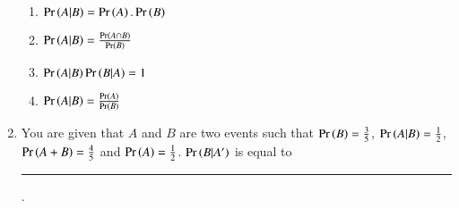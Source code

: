\begin{enumerate}[label=\thesubsection.\arabic*,ref=\thesubsection.\theenumi]
\begin{multicols}{2}
\begin{enumerate}
	\item $\Pr\left(A|B\right) = \Pr\left(A\right).\Pr\left(B\right)$
	\item $\Pr\left(A|B\right) = \frac{\Pr\left(A\cap B\right)}{\Pr\left(B\right)}$
	\item $\Pr\left(A|B\right)\Pr\left(B|A\right) = 1$
	\item $\Pr\left(A|B\right) = \frac{\Pr\left(A\right)}{\Pr\left(B\right)}$
\end{enumerate}
\end{multicols}
\item You are given that $A$ and $B$ are two events such that $\Pr\left(B\right)=\frac{3}{5}$, $\Pr\left(A  |  B\right)=\frac{1}{2}$, $\Pr\left(A+B\right)=\frac{4}{5}$ and $\Pr\left(A\right)=\frac{1}{2}$.  $\Pr\left(B  |  A^\prime\right)$ is equal to \rule{1cm}{0.1pt}.
\end{enumerate}
